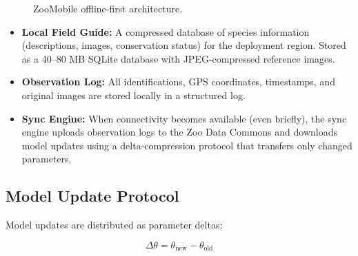 \documentclass[11pt,a4paper]{article}
\begin{document}
\begin{figure}[H]
\centering
{}
\caption{ZooMobile offline-first architecture.}
\label{fig:offline}
\end{figure}

\begin{itemize}[leftmargin=*]
    \item \textbf{Local Field Guide:} A compressed database of species information (descriptions, images, conservation status) for the deployment region. Stored as a 40--80 MB SQLite database with JPEG-compressed reference images.
    \item \textbf{Observation Log:} All identifications, GPS coordinates, timestamps, and original images are stored locally in a structured log.
    \item \textbf{Sync Engine:} When connectivity becomes available (even briefly), the sync engine uploads observation logs to the Zoo Data Commons and downloads model updates using a delta-compression protocol that transfers only changed parameters.
\end{itemize}

\subsection{Model Update Protocol}

Model updates are distributed as parameter deltas:

\begin{equation}
    \Delta\theta = \theta_{\text{new}} - \theta_{\text{old}}
\end{equation}
\end{document}
